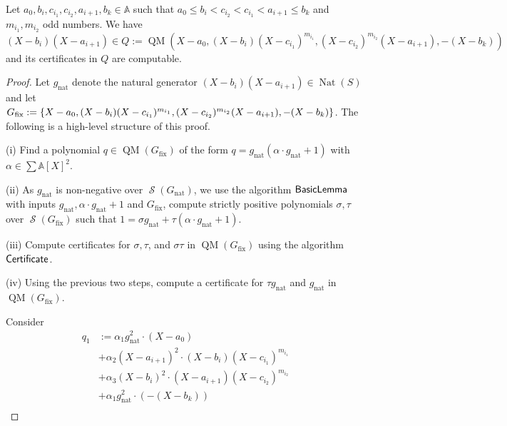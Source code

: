 \documentclass[preprint,12pt,authoryear]{elsarticle}
\newtheorem{proof}[theorem]{Proof}
\newcommand{\aX}{\mathbb{A}[X]}
\DeclarePairedDelimiter{\set}{\lbrace}{\rbrace}
\DeclareMathOperator{\quadmod}{QM}
\DeclareMathOperator{\semialgebraic}{\mathcal{S}}
\DeclareMathOperator{\algBasicLemma}{\sf BasicLemma}
\DeclareMathOperator{\algPutinar}{\sf Certificate}
\DeclareMathOperator{\Nat}{Nat}
\newenvironment{lemmar}[1]{
  \renewcommand\thelemmaalt{#1}
  \lemmaalt
}{\endlemmaalt}
\begin{document}
\begin{lemmar}{\ref{sec:splitting-step-5}}
  Let $a_0, b_i, c_{i_1}, c_{i_2}, a_{i+1}, b_k \in \mathbb{A}$ such that
  $a_0 \leq b_i < c_{i_2} < c_{i_1} < a_{i+1} \leq b_k$ and $m_{i_1}, m_{i_2}$
  odd numbers. We have
  $(X - b_i)(X - a_{i+1}) \in Q := \quadmod(X-a_0, (X - b_i)(X -
  c_{i_1})^{m_{i_1}}, (X - c_{i_2})^{m_{i_2}}(X- a_{i+1}), -(X - b_k))$ and its
  certificates in $Q$ are computable.
\end{lemmar}

\begin{proof}
  Let $g_{\mathrm{nat}}$ denote the natural generator
  $(X-b_i)(X-a_{i+1}) \in \Nat(S)$ and let
  $G_{\mathrm{fix}} := \set{X-a_0, (X - b_i)(X - c_{i_1})^{m_{i_1}}, (X -
    c_{i_2})^{m_{i_2}}(X - a_{i+1}), -(X - b_k)}$. The following is a high-level
  structure of this proof.

  (i) Find a polynomial $q \in \quadmod(G_{\mathrm{fix}})$ of the form
  $q = g_{\mathrm{nat}}(\alpha \cdot g_{\mathrm{nat}} + 1)$ with
  $\alpha \in \sum{\aX}^2$.

  (ii) As $g_{\mathrm{nat}}$ is non-negative over
  $\semialgebraic(G_{\mathrm{nat}})$, we use the algorithm $\algBasicLemma$ with
  inputs $g_{\mathrm{nat}}, \alpha \cdot g_{\mathrm{nat}} + 1$ and
  $G_{\mathrm{fix}}$, compute strictly positive polynomials $\sigma, \tau$ over
  $\semialgebraic(G_{\mathrm{fix}})$ such that
  $1 = \sigma g_{\mathrm{nat}} + \tau (\alpha \cdot g_{\mathrm{nat}} + 1)$.

  (iii) Compute certificates for $\sigma, \tau$, and $\sigma \tau$ in
  $\quadmod(G_{\mathrm{fix}})$ using the algorithm $\algPutinar$.

  (iv) Using the previous two steps, compute a certificate for
  $\tau g_{\mathrm{nat}}$ and $g_{\mathrm{nat}}$ in
  $\quadmod(G_{\mathrm{fix}})$.

  Consider
  \begin{equation}
    \label{sec:splitting-step-8}
    \begin{split}
      q_1 &:= \alpha_1 g_{\mathrm{nat}}^2 \cdot (X - a_0) \\
          &+ \alpha_2(X-a_{i+1})^2 \cdot (X - b_i)(X-c_{i_1})^{m_{i_1}}\\
          &+ \alpha_3(X-b_i)^2 \cdot (X - a_{i+1})(X-c_{i_2})^{m_{i_2}} \\
          &+ \alpha_1 g_{\mathrm{nat}}^2 \cdot (-(X - b_k))\\
    \end{split}
  \end{equation}


\end{proof}
\end{document}

